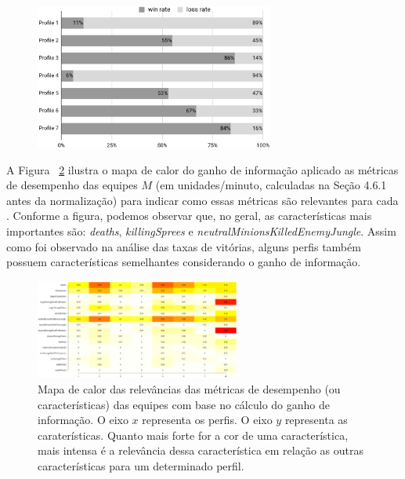 \begin{figure}
  \centering
  \includegraphics[width=0.7\textwidth]{win-rate-plot}%
  \caption{
}
  \label{fig:win-plot}
\end{figure}

A Figura ~\ref{fig:relevance} ilustra o mapa de calor do ganho de informação aplicado as métricas de desempenho das equipes $M$ (em unidades/minuto, calculadas na Seção 4.6.1 antes da normalização) para indicar como essas métricas são relevantes para cada . Conforme a figura, podemos observar que, no geral, as características mais importantes são: \textit{deaths}, \textit{killingSprees} e \textit{neutralMinionsKilledEnemyJungle}. Assim como foi observado na análise das taxas de vitórias, alguns perfis também possuem características semelhantes considerando o ganho de informação.

\begin{figure}
  \centering
  \includegraphics[angle=90,width=0.60\textwidth,height=\textheight,keepaspectratio]{relevance}
  \caption{Mapa de calor das relevâncias das métricas de desempenho (ou características) das equipes com base no cálculo do ganho de informação. O eixo $x$ representa os perfis. O eixo $y$ representa as caraterísticas. Quanto mais forte for a cor de uma característica, mais intensa \'e a relevância dessa caracter\'istica em rela\c{c}\~ao as outras caracter\'isticas para um determinado perfil.}
\label{fig:relevance}
\end{figure}

